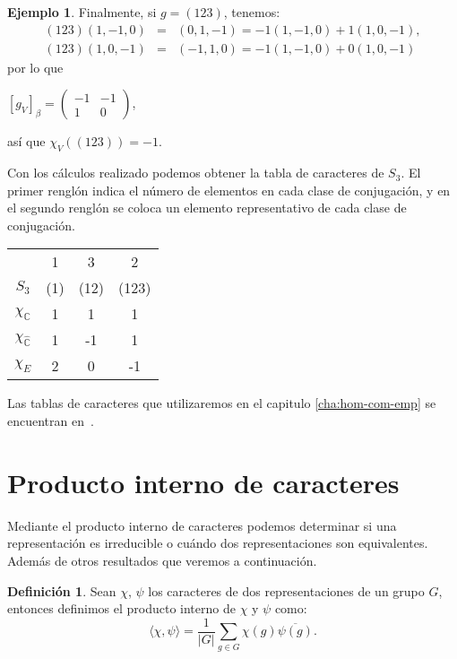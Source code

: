\documentclass[12pt]{book}
\theoremstyle{definition}
\newtheorem{definition}[theorem]{Definición}
\newtheorem{example}[theorem]{Ejemplo}
\newcounter{in}
\newcounter{ini}
\begin{document}
\begin{example}
Finalmente, si $g=(123)$, tenemos:
\begin{eqnarray*}
  (123)(1,-1,0)&=&(0,1,-1)=-1(1,-1,0)+1(1,0,-1),\\
  (123)(1,0,-1)&=&(-1,1,0)=-1(1,-1,0)+0(1,0,-1)
\end{eqnarray*} 
 por lo que 
  \begin{center}
  $[g_{V}]_{\beta}=
  \begin{pmatrix}
    -1 & -1 \\
    1 & 0 
  \end{pmatrix}$,
\end{center}
así que $\chi_{V}((123))=-1$.

Con los cálculos realizado podemos obtener la tabla de caracteres de
$S_{3}$. El primer renglón indica el número de elementos en cada clase de
conjugación, y en el segundo renglón se coloca un elemento representativo de cada
clase de conjugación.
\begin{center}
  \begin{tabular}{ c| c c c}
    & 1 & 3 & 2 \\
    $S_{3}$ & (1) & (12) & (123) \\
    \hline
    $\chi_{\mathbb{C}}$ & 1 & 1 & 1 \\
    $\chi_{\mathbb{\hat C}}$ & 1 & -1 & 1 \\
    $\chi_{E}$ & 2 & 0 & -1 
  \end{tabular}  
\end{center}
Las tablas de caracteres que utilizaremos en el capitulo \ref{cha:hom-com-emp}
se encuentran en~\cite{liebeck}.
\end{example}

\section{Producto interno de caracteres}
\label{producto-interno}

Mediante el producto interno de caracteres  podemos determinar si una
representación es irreducible o cuándo dos representaciones son
equivalentes. Además de otros resultados que veremos a continuación.
\begin{definition}
  Sean $\chi$, $\psi$ los caracteres de dos representaciones de un grupo
  $G$, entonces definimos el producto interno de $\chi$ y $\psi$ como:
  \begin{equation*}
    \langle\chi,\psi\rangle=\frac{1}{|G|}\sum_{g\in G}\chi(g)\overline{\psi(g)}.
  \end{equation*}
\end{definition}
\end{document}
